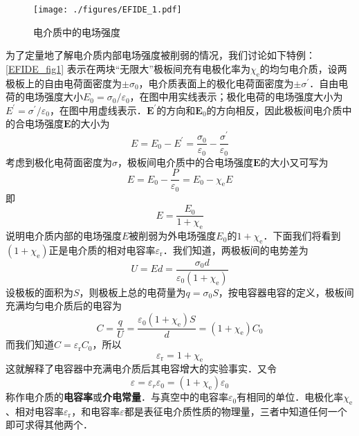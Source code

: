 \begin{figure}[ht]
\centering
\texttt{[image: ./figures/EFIDE\_1.pdf]}
\caption{电介质中的电场强度} \label{EFIDE_fig1}
\end{figure}
为了定量地了解电介质内部电场强度被削弱的情况，我们讨论如下特例：\autoref{EFIDE_fig1} 表示在两块“无限大”极板间充有电极化率为$\chi_\mathrm{e}$的均匀电介质，设两极板上的自由电荷面密度为$\pm \sigma_0$，电介质表面上的极化电荷面密度为$\pm \sigma^\prime$．自由电荷的电场强度大小$E_{0}=\sigma_{0} / \varepsilon_{0}$，在图中用实线表示；极化电荷的电场强度大小为$E^{\prime}=\sigma^{\prime} / \varepsilon_{0}$，在图中用虚线表示．$\mathbf E^\prime$的方向和$\mathbf E_0$的方向相反，因此极板间电介质中的合电场强度$\mathbf E $的大小为
\begin{equation}
E=E_{0}-E^{\prime}=\frac{\sigma_{0}}{\varepsilon_{0}}-\frac{\sigma^{\prime}}{\varepsilon_{0}}
\end{equation}
考虑到极化电荷面密度为$\sigma$，极板间电介质中的合电场强度$\mathbf E $的大小又可写为
\begin{equation}
E=E_{0}-\frac{P}{\varepsilon_{0}}=E_{0}-\chi_{\mathrm e} E
\end{equation}
即
\begin{equation} \label{EFIDE_eq1}
E=\frac{E_{0}}{1+\chi_{\mathrm{e}}}
\end{equation}
说明电介质内部的电场强度$E $被削弱为外电场强度$E_0$的${1+\chi_{\mathrm{e}}}$．下面我们将看到$({1+\chi_{\mathrm{e}}})$正是电介质的相对电容率$\varepsilon_\mathrm{r}$．我们知道，两极板间的电势差为
\begin{equation}
U=E d=\frac{\sigma_{0} d}{\varepsilon_{0}\left(1+\chi_{\mathrm e}\right)}
\end{equation}
设极板的面积为$S$，则极板上总的电荷量为$q=\sigma_{0} S$，按电容器电容的定义，极板间充满均匀电介质后的电容为
\begin{equation}
C=\frac{q}{U}=\frac{\varepsilon_{0}\left(1+\chi_{\mathrm e}\right) S}{d}=\left(1+\chi_{\mathrm e}\right) C_{0}
\end{equation}
而我们知道$C=\varepsilon_\mathrm{r}C_0$，所以
\begin{equation} \label{EFIDE_eq2}
\varepsilon_{\mathrm{r}}=1+\chi_{\mathrm{e}}
\end{equation}
这就解释了电容器中充满电介质后其电容增大的实验事实．又令
\begin{equation}
\varepsilon=\varepsilon_{r} \varepsilon_{0}=\left(1+\chi_{\mathrm{e}}\right) \varepsilon_{0}
\end{equation}
称作电介质的\textbf{电容率}或\textbf{介电常量}．与真空中的电容率$\varepsilon_0$有相同的单位．电极化率$\chi_{\mathrm{e}}$、相对电容率$\varepsilon_\mathrm{r}$，和电容率$\varepsilon$都是表征电介质性质的物理量，三者中知道任何一个即可求得其他两个．

